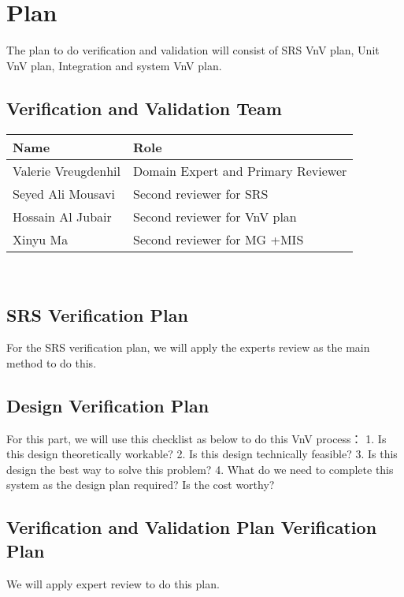 \documentclass[12pt, titlepage]{article}
\begin{document}
\section{Plan}

The plan to do verification and validation will consist of SRS VnV plan, Unit VnV plan, Integration and system VnV plan.

\subsection{Verification and Validation Team}

\begin{tabular}{l l} 
  \toprule		
  \textbf{Name} & \textbf{Role}\\
  \midrule 
  Valerie Vreugdenhil& Domain Expert and Primary Reviewer\\
  Seyed Ali Mousavi& Second reviewer for SRS\\
  Hossain Al Jubair& Second reviewer for VnV plan\\
  Xinyu Ma& Second reviewer for MG +MIS \\

  
  \bottomrule
\end{tabular}\\

\subsection{SRS Verification Plan}

For the SRS verification plan, we will apply the experts review as the main method to do this.

\subsection{Design Verification Plan}

For this part, we will use this checklist as below to do this VnV process：
1. Is this design theoretically workable?
2. Is this design technically feasible?
3. Is this design the best way to solve this problem?
4. What do we need to complete this system as the design plan required? Is the cost worthy?


\subsection{Verification and Validation Plan Verification Plan}

We will apply expert review to do this plan.
\end{document}
